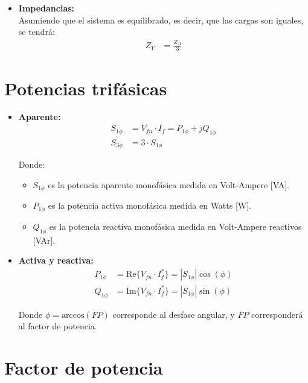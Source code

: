 \documentclass[
  11pt,
  letterpaper,
   addpoints,
  ]{exam}
\begin{document}
\begin{itemize}
    \item \textbf{Impedancias:} \\
    Asumiendo que el sistema es equilibrado, es decir, que las cargas son iguales, se tendrá:
    \begin{align}
        Z_Y &= \frac{Z_{\Delta}}{3}
    \end{align}
\end{itemize}

\section*{Potencias trifásicas}

\begin{itemize}
    \item \textbf{Aparente:}
    \begin{align}
        S_{1\phi} &= V_{fn} \cdot I_{f} = P_{1\phi} + jQ_{1\phi} \\
        S_{3\phi} &= 3 \cdot S_{1\phi}
    \end{align}
    
    Donde:
    \begin{itemize}
        \item $S_{1\phi}$ es la potencia aparente monofásica medida en Volt-Ampere [VA].
        \item $P_{1\phi}$ es la potencia activa monofásica medida en Watts [W].
        \item $Q_{1\phi}$ es la potencia reactiva monofásica medida en Volt-Ampere reactivos [VAr].
    \end{itemize}
    
    \item \textbf{Activa y reactiva:}
    \begin{align}
        P_{1\phi} &= \text{Re}\{V_{fn} \cdot I_{f}^*\} = |S_{1\phi}|\cos(\phi) \\
        Q_{1\phi} &= \text{Im}\{V_{fn} \cdot I_{f}^*\} = |S_{1\phi}|\sin(\phi)
    \end{align}
    
    Donde $\phi = \text{arccos}(FP)$ corresponde al desfase angular, y $FP$ corresponderá al factor de potencia.
    
\end{itemize}

\section*{Factor de potencia}
\end{document}
